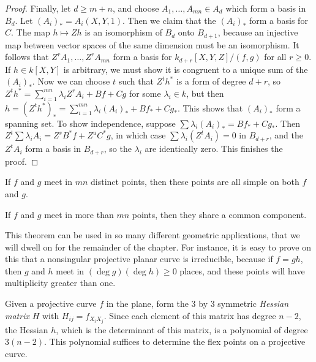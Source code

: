 \begin{proof}
    Finally, let $d \geq m + n$, and choose $A_1, \dots, A_{mn} \in A_d$ which form a basis in $B_d$. Let $(A_i)_* = A_i(X,Y,1)$. Then we claim that the $(A_i)_*$ form a basis for $C$. The map $h \mapsto Zh$ is an isomorphism of $B_d$ onto $B_{d+1}$, because an injective map between vector spaces of the same dimension must be an isomorphism. It follows that $Z^rA_1, \dots, Z^rA_{mn}$ form a basis for $k_{d+r}[X,Y,Z]/(f,g)$ for all $r \geq 0$. If $h \in k[X,Y]$ is arbitrary, we must show it is congruent to a unique sum of the $(A_i)_*$. Now we can choose $t$ such that $Z^th^*$ is a form of degree $d + r$, so $Z^th^* = \sum_{i = 1}^{mn} \lambda_i Z^rA_i + Bf + Cg$ for some $\lambda_i \in k$, but then $h = (Z^th^*)_* = \sum_{i = 1}^{mn} \lambda_i (A_i)_* + Bf_* + Cg_*$. This shows that $(A_i)_*$ form a spanning set. To show independence, suppose $\sum \lambda_i (A_i)_* = Bf_* + Cg_*$. Then $Z^t \sum \lambda_i A_i = Z^s B^*f + Z^u C^*g$, in which case $\sum \lambda_i (Z^t A_i) = 0$ in $B_{d+r}$, and the $Z^tA_i$ form a basis in $B_{d+r}$, so the $\lambda_i$ are identically zero. This finishes the proof.
\end{proof}

\begin{corollary}
    If $f$ and $g$ meet in $mn$ distinct points, then these points are all simple on both $f$ and $g$.
\end{corollary}

\begin{corollary}
    If $f$ and $g$ meet in more than $mn$ points, then they share a common component.
\end{corollary}

This theorem can be used in so many different geometric applications, that we will dwell on for the remainder of the chapter. For instance, it is easy to prove on this that a nonsingular projective planar curve is irreducible, because if $f = gh$, then $g$ and $h$ meet in $(\deg g)(\deg h) \geq 0$ places, and these points will have multiplicity greater than one.

Given a projective curve $f$ in the plane, form the 3 by 3 symmetric \emph{Hessian matrix} $H$ with $H_{ij} = f_{X_i X_j}$. Since each element of this matrix has degree $n-2$, the Hessian $h$, which is the determinant of this matrix, is a polynomial of degree $3(n-2)$. This polynomial suffices to determine the flex points on a projective curve.

